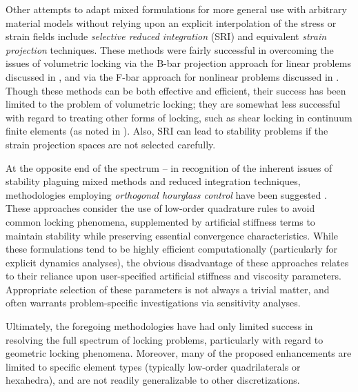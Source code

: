 		Other attempts to adapt mixed formulations for more general use with arbitrary material models without relying upon an explicit interpolation of the stress or strain fields include \textit{selective reduced integration} (SRI) and equivalent \textit{strain projection} techniques. These methods were fairly successful in overcoming the issues of volumetric locking via the B-bar projection approach for linear problems discussed in \cite{Hughes:00}, and via the F-bar approach for nonlinear problems discussed in \cite{Souza:96}. Though these methods can be both effective and efficient, their success has been limited to the problem of volumetric locking; they are somewhat less successful with regard to treating other forms of locking, such as shear locking in continuum finite elements (as noted in \cite{Malkus&Hughes:78}). Also, SRI can lead to stability problems if the strain projection spaces are not selected carefully.
		
		At the opposite end of the spectrum -- in recognition of the inherent issues of stability plaguing mixed methods and reduced integration techniques, methodologies employing \textit{orthogonal hourglass control} have been suggested \cite{Flanagan:81}. These approaches consider the use of low-order quadrature rules to avoid common locking phenomena, supplemented by artificial stiffness terms to maintain stability while preserving essential convergence characteristics. While these formulations tend to be highly efficient computationally (particularly for explicit dynamics analyses), the obvious disadvantage of these approaches relates to their reliance upon user-specified artificial stiffness and viscosity parameters. Appropriate selection of these parameters is not always a trivial matter, and often warrants problem-specific investigations via sensitivity analyses.
			
		Ultimately, the foregoing methodologies have had only limited success in resolving the full spectrum of locking problems, particularly with regard to geometric locking phenomena. Moreover, many of the proposed enhancements are limited to specific element types (typically low-order quadrilaterals or hexahedra), and are not readily generalizable to other discretizations.
		
